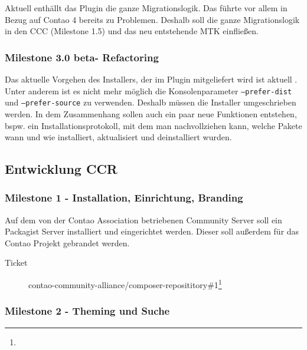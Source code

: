 \documentclass[
paper=a4,
draft=false,%
fontsize=10pt%
]{scrartcl}
\begin{document}
Aktuell enthällt das Plugin die ganze Migrationslogik. Das führte vor allem in Bezug auf Contao 4 bereits zu Problemen. Deshalb soll die ganze Migrationslogik in den CCC (Milestone 1.5) und das neu entstehende MTK einfließen.

\subsubsection[Milestone 3.0 beta - Refactoring]{Milestone 3.0 beta\footnotemark - Refactoring}
\label{subsec:ccp-milestone-3.0-beta}

Das aktuelle Vorgehen des Installers, der im Plugin mitgeliefert wird ist aktuell . Unter anderem ist es nicht mehr möglich die Konsolenparameter \texttt{--prefer-dist} und \texttt{--prefer-source} zu verwenden. Deshalb müssen die Installer umgeschrieben werden. In dem Zusammenhang sollen auch ein paar neue Funktionen entstehen, bspw. ein Installationsprotokoll, mit dem man nachvollziehen kann, welche Pakete wann und wie installiert, aktualisiert und deinstalliert wurden.

\pagebreak

\subsection{Entwicklung CCR}
\label{subsec:ccr}

\subsubsection{Milestone 1 - Installation, Einrichtung, Branding}
\label{subsec:ccr-milestone-1}

Auf dem von der Contao Association betriebenen Community Server soll ein Packagist Server installiert und eingerichtet werden. Dieser soll außerdem für das Contao Projekt gebrandet werden.

\begin{description}
\item[Ticket] contao-community-alliance/composer-reposititory\#1\footnote{}
\end{description}

\subsubsection{Milestone 2 - Theming und Suche}
\label{subsec:ccr-milestone-2}
\end{document}
